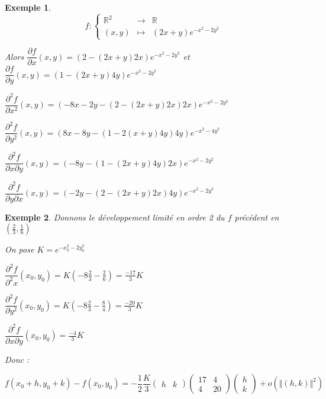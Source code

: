 \documentclass[a4paper,12pt]{book}
\newtheorem{Exe}{Exemple}[section]
\def\R{\mathbb{R}}
\begin{document}
\begin{Exe}
$$f:\left\{\begin{array}{rcl} \R^2 & \to & \R \\ (x,y) & \mapsto & (2x+y)e^{-x^2-2y^2}\end{array}\right.$$
\par Alors $\dfrac{\partial f}{\partial x}(x,y) = (2-(2x+y)2x)e^{-x^2-2y^2}$ et $\dfrac{\partial f}{\partial y}(x,y) = (1-(2x+y)4y)e^{-x^2-2y^2}$
\par $\dfrac{\partial^2 f}{\partial x^2}(x,y) = (-8x-2y-(2-(2x+y)2x)2x)e^{-x^2-2y^2}$
\par $\dfrac{\partial^2 f}{\partial y^2}(x,y) = (8x-8y-(1-2(x+y)4y)4y)e^{-x^2-4y^2}$
\par $\dfrac{\partial^2 f}{\partial x\partial y}(x,y) = (-8y-(1-(2x+y)4y)2x)e^{-x^2-2y^2}$
\par $\dfrac{\partial^2 f}{\partial y\partial x}(x,y) = (-2y-(2-(2x+y)2x)4y)e^{-x^2-2y^2}$
\end{Exe}
\begin{Exe}
Donnons le développement limité en ordre 2 du $f$ précédent en $(\frac{2}{3}, \frac{1}{6})$
\par On pose $K = e^{-x_0^2-2y_0^2}$
\par $\dfrac{\partial^2 f}{\partial^2 x}(x_0, y_0) = K\left(-8\frac{2}{3}- \frac{2}{6}\right)=\frac{-17}{3}K$
\par $\dfrac{\partial^2 f}{\partial y^2}(x_0, y_0) = K\left(-8\frac{2}{3}-\frac{8}{4}\right) = \frac{-20}{3}K$
\par $\dfrac{\partial^2 f}{\partial x\partial y}(x_0, y_0) = \frac{-4}{3}K$
\par Donc :
\par $$f(x_0+h, y_0+k) - f(x_0, y_0) = -\frac{1}{2}\frac{K}{3}\begin{pmatrix} h & k\end{pmatrix}\begin{pmatrix} 17 & 4 \\ 4 & 20\end{pmatrix}\begin{pmatrix} h \\ k\end{pmatrix} + o(\Vert (h,k)\Vert^2)$$
\end{Exe}
\end{document}
